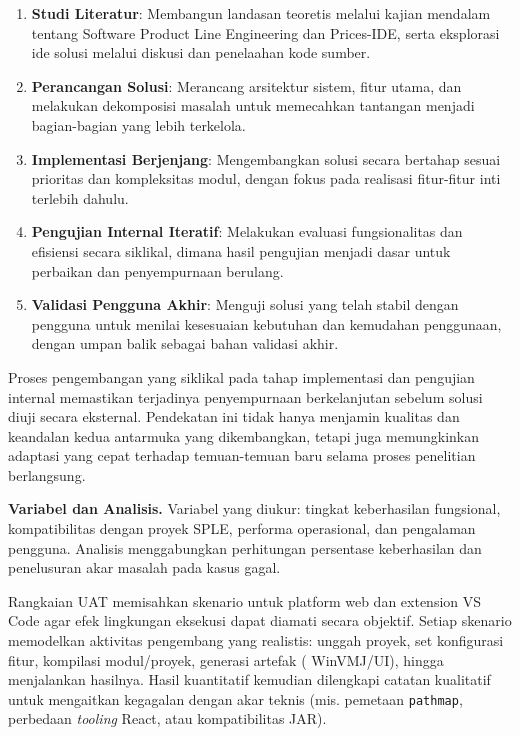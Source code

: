 \documentclass[12pt,a4paper,onecolumn]{article}
\begin{document}
\begin{enumerate}[leftmargin=*, label=\arabic*., itemsep=0.5\baselineskip]
    \item \textbf{Studi Literatur}: Membangun landasan teoretis melalui kajian mendalam tentang Software Product Line Engineering dan Prices-IDE, serta eksplorasi ide solusi melalui diskusi dan penelaahan kode sumber.
    
    \item \textbf{Perancangan Solusi}: Merancang arsitektur sistem, fitur utama, dan melakukan dekomposisi masalah untuk memecahkan tantangan menjadi bagian-bagian yang lebih terkelola.
    
    \item \textbf{Implementasi Berjenjang}: Mengembangkan solusi secara bertahap sesuai prioritas dan kompleksitas modul, dengan fokus pada realisasi fitur-fitur inti terlebih dahulu.
    
    \item \textbf{Pengujian Internal Iteratif}: Melakukan evaluasi fungsionalitas dan efisiensi secara siklikal, dimana hasil pengujian menjadi dasar untuk perbaikan dan penyempurnaan berulang.
    
    \item \textbf{Validasi Pengguna Akhir}: Menguji solusi yang telah stabil dengan pengguna untuk menilai kesesuaian kebutuhan dan kemudahan penggunaan, dengan umpan balik sebagai bahan validasi akhir.
\end{enumerate}

Proses pengembangan yang siklikal pada tahap implementasi dan pengujian internal memastikan terjadinya penyempurnaan berkelanjutan sebelum solusi diuji secara eksternal. Pendekatan ini tidak hanya menjamin kualitas dan keandalan kedua antarmuka yang dikembangkan, tetapi juga memungkinkan adaptasi yang cepat terhadap temuan-temuan baru selama proses penelitian berlangsung.

\textbf{Variabel dan Analisis.} Variabel yang diukur: tingkat keberhasilan fungsional, kompatibilitas dengan proyek SPLE, performa operasional, dan pengalaman pengguna. Analisis menggabungkan perhitungan persentase keberhasilan dan penelusuran akar masalah pada kasus gagal.

Rangkaian UAT memisahkan skenario untuk platform web dan extension VS Code agar efek lingkungan eksekusi dapat diamati secara objektif. Setiap skenario memodelkan aktivitas pengembang yang realistis: unggah proyek, set konfigurasi fitur, kompilasi modul/proyek, generasi artefak (
WinVMJ/UI), hingga menjalankan hasilnya. Hasil kuantitatif kemudian dilengkapi catatan kualitatif untuk mengaitkan kegagalan dengan akar teknis (mis. pemetaan \texttt{pathmap}, perbedaan \textit{tooling} React, atau kompatibilitas JAR).
\end{document}

